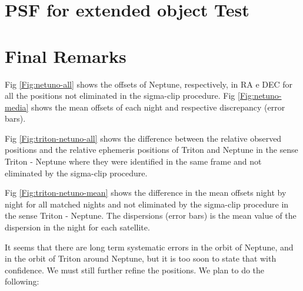 \documentclass[12pt,a4paper]{report}
\begin{document}

\section*{PSF for extended object Test}

\section*{Final Remarks}

Fig \ref{Fig:netuno-all} shows the offsets of Neptune, respectively, in RA e DEC for all the positions not eliminated in the sigma-clip procedure. Fig \ref{Fig:netuno-media} shows the mean offsets of each night and respective discrepancy (error bars).

Fig \ref{Fig:triton-netuno-all} shows the difference between the relative observed positions and the relative ephemeris positions of Triton and Neptune in the sense Triton - Neptune where they were identified in the same frame and not eliminated by the sigma-clip procedure.

Fig \ref{Fig:triton-netuno-mean} shows the difference in the mean offsets night by night for all matched nights and not eliminated by the sigma-clip procedure in the sense Triton - Neptune. The dispersions (error bars) is the mean value of the dispersion in the night for each satellite.



It seems that there are long term systematic errors in the orbit of Neptune, and in the orbit of Triton around Neptune, but it is too soon to state that with confidence. We must still further refine the positions. We plan to do the following:
\end{document}
